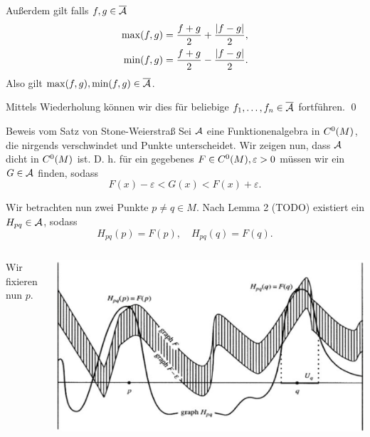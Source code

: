 \begin{frame}
    Außerdem gilt falls \(f,g \in \overline{\mathcal{A}} \)
    \pause
    \begin{align*}
        \max(f,g) &= \frac{f+g}{2} + \frac{\left|f-g\right|}{2}, \\
        \min(f,g) &= \frac{f+g}{2} - \frac{\left|f-g\right|}{2}.
    \end{align*} 
    \pause
    Also gilt \( \max(f,g), \min(f,g) \in \overline{\mathcal{A}} \). 
    \pause

    Mittels Wiederholung können wir dies für beliebige 
    \( f_1, \ldots, f_n \in \overline{\mathcal{A}} \) fortführen.
    \qed
\end{frame}

\begin{frame}{Beweis vom Satz von Stone-Weierstraß}
    Sei \( \mathcal{A} \) eine Funktionenalgebra in \(C^0(M)\), die nirgends verschwindet und 
    Punkte unterscheidet. \pause
    Wir zeigen nun, dass \( \mathcal{A} \) dicht in \(C^0(M)\) ist. \pause
    D. h. für ein gegebenes \( F \in C^0(M), \varepsilon > 0 \) 
    müssen wir ein \( G \in \mathcal{A} \) finden, sodass 
    \[ F(x) - \varepsilon < G(x) < F(x) + \varepsilon. \]
    \pause

    Wir betrachten nun zwei Punkte \(p\neq q \in M\).
    Nach Lemma 2 (TODO) existiert ein \(H_{pq} \in \mathcal{A}\), 
    sodass 
    \[ H_{pq}(p) = F(p), \quad H_{pq}(q) = F(q). \]
\end{frame}

\begin{frame}
    \begin{columns}
        \begin{column}{0.4\textwidth}
            Wir fixieren nun \(p\).
        \end{column}
        \begin{column}{0.6\textwidth}
            \includegraphics[width=\textwidth]{images/stone-weierstrass-step1.png}
        \end{column}
    \end{columns}
\end{frame}


